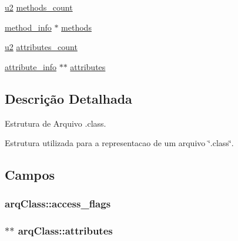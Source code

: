 \begin{DoxyCompactItemize}
\item 
\hyperlink{_e___l_e_c_l_a_s_s_8h_a5f223212eef04d10a4550ded680cb1cf}{u2} \hyperlink{structarq_class_a0cdd803ff7b2a6a229c048bb51f1febc}{methods\+\_\+count}
\item 
\hyperlink{_e___l_e_c_l_a_s_s_8h_a02c1a928a94e9fab2c72044003c7bce6}{method\+\_\+info} $\ast$ \hyperlink{structarq_class_a849a70430b6245a2cc8b43a2516c5f00}{methods}
\item 
\hyperlink{_e___l_e_c_l_a_s_s_8h_a5f223212eef04d10a4550ded680cb1cf}{u2} \hyperlink{structarq_class_a4510e8903370aa3575adaa708e4bfed8}{attributes\+\_\+count}
\item 
\hyperlink{_e___l_e_c_l_a_s_s_8h_a4c2796d61bb99bf730b1807fc838c847}{attribute\+\_\+info} $\ast$$\ast$ \hyperlink{structarq_class_aacb6074d36dde206bc823e0b30d473b5}{attributes}
\end{DoxyCompactItemize}


\subsection{Descrição Detalhada}
Estrutura de Arquivo .class. 

Estrutura utilizada para a representacao de um arquivo \char`\"{}.\+class\char`\"{}. 

\subsection{Campos}
\hypertarget{structarq_class_a2d74614ed3f671871c0385e5233a8250}{}
\subsubsection[{access\+\_\+flags}]{ arq\+Class\+::access\+\_\+flags}\label{structarq_class_a2d74614ed3f671871c0385e5233a8250}
\hypertarget{structarq_class_aacb6074d36dde206bc823e0b30d473b5}{}
\subsubsection[{attributes}]{$\ast$$\ast$ arq\+Class\+::attributes}\label{structarq_class_aacb6074d36dde206bc823e0b30d473b5}
\hypertarget{structarq_class_a4510e8903370aa3575adaa708e4bfed8}{}

